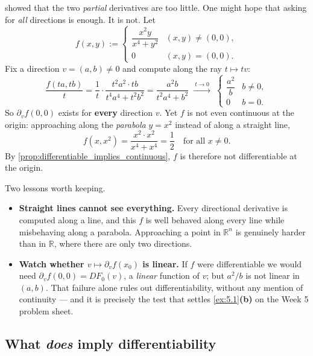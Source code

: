 \begin{aiexample}
\label{ex:all_directional_derivatives_exist}
 showed that the two \emph{partial} derivatives are
too little. One might hope that asking for \emph{all} directions is enough. It is not. Let
\[f(x,y) := \begin{cases} \dfrac{x^2y}{x^4+y^2} & (x,y) \neq (0,0), \\[1ex] 0 & (x,y)=(0,0).\end{cases}\]
Fix a direction $v = (a,b) \neq 0$ and compute along the ray $t \mapsto tv$:
\[\frac{f(ta,tb)}{t} = \frac{1}{t}\cdot\frac{t^2a^2\cdot tb}{t^4a^4+t^2b^2}
   = \frac{a^2b}{t^2a^4+b^2} \;\xrightarrow{\ t\to0\ }\;
   \begin{cases} \dfrac{a^2}{b} & b \neq 0, \\[1ex] 0 & b = 0.\end{cases}\]
So $\partial_vf(0,0)$ exists for \textbf{every} direction $v$. Yet $f$ is not even continuous at
the origin: approaching along the \emph{parabola} $y=x^2$ instead of along a straight line,
\[f(x,x^2) = \frac{x^2\cdot x^2}{x^4+x^4} = \frac12 \quad\text{for all } x \neq 0.\]
By \cref{prop:differentiable_implies_continuous}, $f$ is therefore not differentiable at the
origin.

Two lessons worth keeping.
\begin{itemize}
  \item \textbf{Straight lines cannot see everything.} Every directional derivative is computed
    along a line, and this $f$ is well behaved along every line while misbehaving along a
    parabola. Approaching a point in $\mathbb{R}^n$ is genuinely harder than in $\mathbb{R}$,
    where there are only two directions.
  \item \textbf{Watch whether $v \mapsto \partial_vf(x_0)$ is linear.} If $f$ were differentiable
    we would need $\partial_vf(0,0) = DF_0(v)$, a \emph{linear} function of $v$; but $a^2/b$ is
    not linear in $(a,b)$. That failure alone rules out differentiability, without any mention of
    continuity --- and it is precisely the test that settles \cref{ex:5.1}\textbf{(b)} on the
    Week 5 problem sheet.
\end{itemize}
\end{aiexample}

\subsection{What \emph{does} imply differentiability}
\label{sec:sufficient_condition_differentiability}

